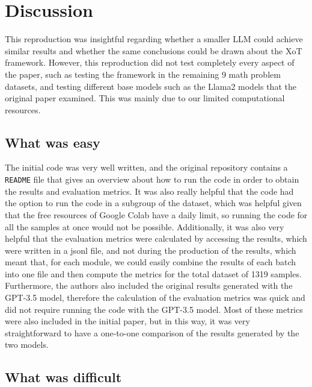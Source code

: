 \documentclass[10pt]{article} %
\begin{document}
\section{Discussion}

This reproduction was insightful regarding whether a smaller LLM could achieve similar results and whether the same conclusions could be drawn about the XoT framework. However, this reproduction did not test completely every aspect of the paper, such as testing the framework in the remaining 9 math problem datasets, and testing different base models such as the Llama2 models that the original paper examined. This was mainly due to our limited computational resources.

\subsection{What was easy}

The initial code was very well written, and the original repository contains a \texttt{README} file that gives an overview about how to run the code in order to obtain the results and evaluation metrics. It was also really helpful that the code had the option to run the code in a subgroup of the dataset, which was helpful given that the free resources of Google Colab have a daily limit, so running the code for all the samples at once would not be possible. Additionally, it was also very helpful that the evaluation metrics were calculated by accessing the results, which were written in a jsonl file, and not during the production of the results, which meant that, for each module, we could easily combine the results of each batch into one file and then compute the metrics for the total dataset of 1319 samples. Furthermore, the authors also included the original results generated with the GPT-3.5 model, therefore the calculation of the evaluation metrics was quick and did not require running the code with the GPT-3.5 model. Most of these metrics were also included in the initial paper, but in this way, it was very straightforward to have a one-to-one comparison of the results generated by the two models.

\subsection{What was difficult}
\end{document}
